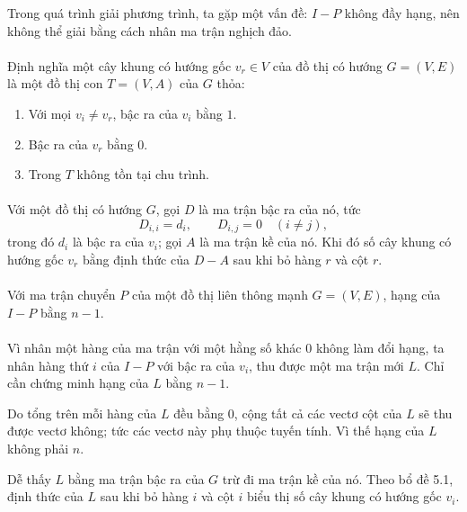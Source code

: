 \documentclass[11pt]{article}
\begin{document}
Trong quá trình giải phương trình, ta gặp một vấn đề: \(I-P\) không đầy hạng,
nên không thể giải bằng cách nhân ma trận nghịch đảo.

\paragraph{}
Định nghĩa một cây khung có hướng gốc \(v_r\in V\) của đồ thị có hướng
\(G=(V,E)\) là một đồ thị con \(T=(V,A)\) của \(G\) thỏa:
\begin{enumerate}
  \item Với mọi \(v_i\ne v_r\), bậc ra của \(v_i\) bằng \(1\).
  \item Bậc ra của \(v_r\) bằng \(0\).
  \item Trong \(T\) không tồn tại chu trình.
\end{enumerate}

\paragraph{}
Với một đồ thị có hướng \(G\), gọi \(D\) là ma trận bậc ra của nó, tức
\[
  D_{i,i}=d_i,\qquad D_{i,j}=0\quad(i\ne j),
\]
trong đó \(d_i\) là bậc ra của \(v_i\); gọi \(A\) là ma trận kề của nó. Khi đó
số cây khung có hướng gốc \(v_r\) bằng định thức của \(D-A\) sau khi bỏ hàng
\(r\) và cột \(r\).

\paragraph{}
Với ma trận chuyển \(P\) của một đồ thị liên thông mạnh \(G=(V,E)\), hạng của
\(I-P\) bằng \(n-1\).

\paragraph{}
Vì nhân một hàng của ma trận với một hằng số khác \(0\) không làm đổi hạng, ta
nhân hàng thứ \(i\) của \(I-P\) với bậc ra của \(v_i\), thu được một ma trận
mới \(L\). Chỉ cần chứng minh hạng của \(L\) bằng \(n-1\).

Do tổng trên mỗi hàng của \(L\) đều bằng \(0\), cộng tất cả các vectơ cột của
\(L\) sẽ thu được vectơ không; tức các vectơ này phụ thuộc tuyến tính. Vì thế
hạng của \(L\) không phải \(n\).

Dễ thấy \(L\) bằng ma trận bậc ra của \(G\) trừ đi ma trận kề của nó. Theo bổ
đề 5.1, định thức của \(L\) sau khi bỏ hàng \(i\) và cột \(i\) biểu thị số cây
khung có hướng gốc \(v_i\).
\end{document}
